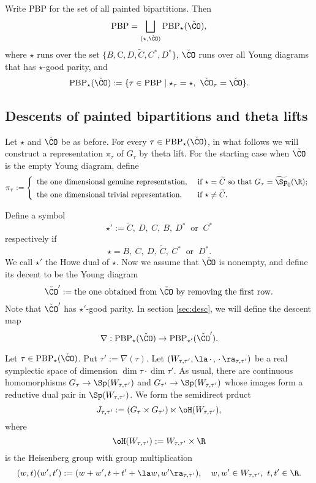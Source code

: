 \documentclass[ssunip.tex]{subfiles}
\begin{document}
Write $\mathrm{PBP}$ for the set of all painted bipartitions. Then
\[
   \mathrm{PBP}=\bigsqcup_{(\star, \check \CO)}  \mathrm{PBP}_\star(\check \CO),
\]
where $\star$ runs over the set $\{ B,\mathrm  C,  D, \widetilde{C},  C^*, D^*\}$, $\check \CO$ runs over all Young diagrams that has $\star$-good parity, and
 \[
  \mathrm{PBP}_\star(\check \CO):=\{\tau\in \mathrm{PBP} \mid \star_\tau=\star, \ \check \CO_\tau=\check \CO\}.
   \]


\subsection{Descents of painted bipartitions and theta lifts}

Let $\star$ and $\check \CO$ be as before. For every $\tau\in \mathrm{PBP}_\star(\check \CO)$, in what follows we will construct a representation $\pi_\tau$ of $G_\tau$ by theta lift.
For the starting case when $\check \CO$ is the empty Young diagram, define
 \[
 \pi_\tau:= \left\{
     \begin{array}{ll}
         \textrm{the one dimensional genuine representation} , &\hbox{ if $\star=\widetilde C$ so that $G_\tau=\widetilde{\Sp}_0(\R)$;} \smallskip\\
 \textrm{the one dimensional trivial representation} , &\hbox{  if $\star\neq \widetilde C$.}            \end{array}
   \right.
\]



Define a symbol
\[
\star':=\widetilde{C}, \ D, \  C, \ B, \ D^*\  \textrm{ or } \ C^*
\]
respectively if
\[
\star=B,\  C, \ D, \ \widetilde{C}, \ C^* \ \textrm{ or }\  D^*.
\]
We call $\star'$
 the Howe dual of $\star$. Now we assume that $\check \CO$ is nonempty, and define its decent to be the Young diagram
 \[
   \check \CO':=\textrm{the one obtained from $\check \CO$ by removing the first row.}
         \]
 Note that $\check \CO'$ has $\star'$-good parity.
 In section \ref{sec:desc}, we will define the descent map
 \[
   \nabla:  \mathrm{PBP}_\star(\check \CO)\rightarrow  \mathrm{PBP}_{\star'}(\check \CO').
 \]

 Let $\tau\in  \mathrm{PBP}_\star(\check \CO)$.  Put $\tau':=\nabla(\tau)$.
   Let $(W_{\tau, \tau'}, \la \,\cdot\,,\,\cdot\,\ra_{\tau, \tau'})$ be a real symplectic space of  dimension $\dim \tau\cdot \dim \tau'$. As usual, there are continuous homomorphisms $G_\tau\rightarrow \Sp(W_{\tau, \tau'})$ and $G_{\tau'}\rightarrow \Sp(W_{\tau, \tau'})$ whose images form a reductive dual pair in $\Sp(W_{\tau, \tau'})$. We form the semidirect prduct
   \[
   J_{\tau, \tau'}:=(G_\tau\times G_{\tau'})\ltimes \oH(W_{\tau, \tau'}),
   \]
   where
  \[
  \oH(W_{\tau, \tau'}):=W_{\tau, \tau'}\times \R
  \]
  is the Heisenberg group with group multiplication
  \[
  (w,t)(w',t'):=(w+w', t+t'+\la w,w'\ra_{\tau, \tau'}), \quad
  w,w'\in W_{\tau, \tau'},\,\,t,t'\in \R.
 \]
\end{document}
